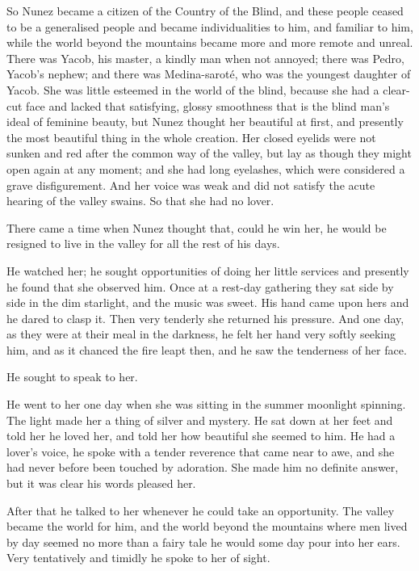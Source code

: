 \documentclass[courier]{sffms}
\begin{document}
So Nunez became a citizen of the Country of the Blind, and these
people ceased to be a generalised people and became individualities to
him, and familiar to him, while the world beyond the mountains became
more and more remote and unreal. There was Yacob, his master, a kindly
man when not annoyed; there was Pedro, Yacob's nephew; and there was
Medina-sarot\'e, who was the youngest daughter of Yacob. She was little
esteemed in the world of the blind, because she had a clear-cut face
and lacked that satisfying, glossy smoothness that is the blind man's
ideal of feminine beauty, but Nunez thought her beautiful at first,
and presently the most beautiful thing in the whole creation. Her
closed eyelids were not sunken and red after the common way of the
valley, but lay as though they might open again at any moment; and she
had long eyelashes, which were considered a grave disfigurement. And
her voice was weak and did not satisfy the acute hearing of the valley
swains. So that she had no lover.

There came a time when Nunez thought that, could he win her, he would
be resigned to live in the valley for all the rest of his days.

He watched her; he sought opportunities of doing her little services
and presently he found that she observed him. Once at a rest-day
gathering they sat side by side in the dim starlight, and the music
was sweet. His hand came upon hers and he dared to clasp it. Then very
tenderly she returned his pressure. And one day, as they were at their
meal in the darkness, he felt her hand very softly seeking him, and as
it chanced the fire leapt then, and he saw the tenderness of her face.

He sought to speak to her.

He went to her one day when she was sitting in the summer moonlight
spinning.  The light made her a thing of silver and mystery. He sat
down at her feet and told her he loved her, and told her how beautiful
she seemed to him. He had a lover's voice, he spoke with a tender
reverence that came near to awe, and she had never before been touched
by adoration. She made him no definite answer, but it was clear his
words pleased her.

After that he talked to her whenever he could take an opportunity. The
valley became the world for him, and the world beyond the mountains
where men lived by day seemed no more than a fairy tale he would some
day pour into her ears. Very tentatively and timidly he spoke to her
of sight.
\end{document}
